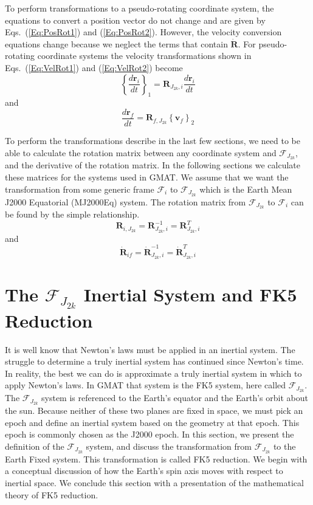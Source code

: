 To perform transformations to a pseudo-rotating coordinate system,
the equations to convert a  position vector do not change and are
given by Eqs.~(\ref{Eq:PosRot1}) and (\ref{Eq:PosRot2}).  However,
the velocity conversion equations change because we neglect the
terms that contain $\dot{\mathbf{R}}$.  For pseudo-rotating
coordinate systems the velocity transformations shown in
Eqs.~(\ref{Eq:VelRot1}) and (\ref{Eq:VelRot2}) become
%
\begin{equation}
          \left\{\frac{d\mathbf{r}_i}{dt}\right\}_1 =  \mathbf{R}_{J_{2k},i}\frac{d\mathbf{r}_{i}}{dt}
\end{equation}
%
and
%
\begin{equation}
  \frac{d\mathbf{r}_f}{dt} =  \mathbf{R}_{f,J_{2k}}\left\{\mathbf{v}_f\right\}_{2}
\end{equation}
%

To perform the transformations describe in the last few sections, we
need to be able to calculate the rotation matrix between any
coordinate system and $\mathcal{F}_{J_{2k}}$, and the derivative of
the rotation matrix. In the following sections we calculate these
matrices for the systems used in GMAT.  We assume that we want the
transformation from some generic frame $\mathcal{F}_i$ to
$\mathcal{F}_{J_{2k}}$ which is the Earth Mean J2000 Equatorial
(MJ2000Eq) system.  The rotation matrix from $\mathcal{F}_{J_{2k}}$
to $\mathcal{F}_i$ can be found by the simple relationship.
%
\begin{equation}
      \mathbf{R}_{i,J_{2k}} = \mathbf{R}_{J_{2k},i}^{-1} = \mathbf{R}_{J_{2k},i}^{T}
\end{equation}
%
and
%
\begin{equation}
      \dot{\mathbf{R}}_{if} = \dot{\mathbf{R}}_{J_{2k},i}^{-1} = \dot{\mathbf{R}}_{J_{2k},i}^{T}
\end{equation}

\section{The $\mathcal{F}_{J_{2k}}$ Inertial System and FK5 Reduction}

It is well know that Newton's laws must be applied in an inertial
system.  The struggle to determine a truly inertial system has
continued since Newton's time.  In reality, the best we can do is
approximate a truly inertial system  in which to apply Newton's
laws. In GMAT that system is the FK5 system, here called
$\mathcal{F}_{J_{2k}}$.  The $\mathcal{F}_{J_{2k}}$ system is
referenced to the Earth's equator and the Earth's orbit about the
sun.  Because neither of these two planes are fixed in space, we
must pick an epoch and define an inertial system based on the
geometry at that epoch.  This epoch is commonly chosen as the J2000
epoch.  In this section, we present the definition of the
$\mathcal{F}_{J_{2k}}$ system, and discuss the transformation from
$\mathcal{F}_{J_{2k}}$  to the Earth Fixed system.  This
transformation is called FK5 reduction.  We begin with a conceptual
discussion of how the Earth's spin axis moves with respect to
inertial space.  We conclude this section with a presentation of the
mathematical theory of FK5 reduction.

